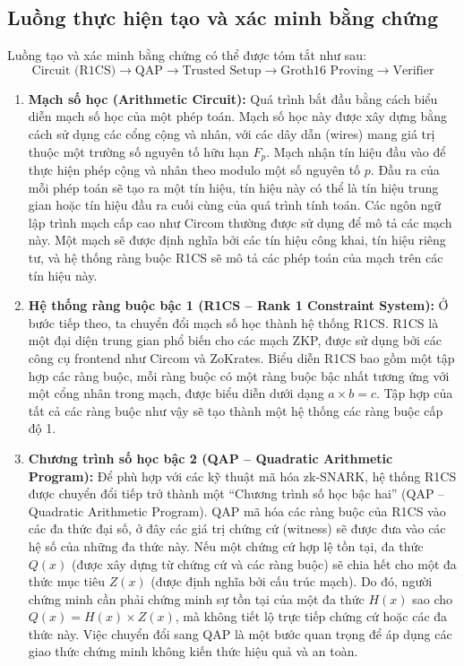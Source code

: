\subsection{Luồng thực hiện tạo và xác minh bằng chứng}
Luồng tạo và xác minh bằng chứng \cite{shi2023data} \cite{ernstberger2024zk} có thể được tóm tắt như sau:
\[
\text{Circuit (R1CS)} \rightarrow \text{QAP} \rightarrow \text{Trusted Setup} \rightarrow \text{Groth16 Proving} \rightarrow \text{Verifier}
\]
\begin{enumerate}
    \item \textbf{Mạch số học (Arithmetic Circuit):} Quá trình bắt đầu bằng cách biểu diễn mạch số học của một phép toán. Mạch số học này được xây dựng bằng cách sử dụng các cổng cộng và nhân, với các dây dẫn (wires) mang giá trị thuộc một trường số nguyên tố hữu hạn \( F_p \). Mạch nhận tín hiệu đầu vào để thực hiện phép cộng và nhân theo modulo một số nguyên tố \( p \). Đầu ra của mỗi phép toán sẽ tạo ra một tín hiệu, tín hiệu này có thể là tín hiệu trung gian hoặc tín hiệu đầu ra cuối cùng của quá trình tính toán. Các ngôn ngữ lập trình mạch cấp cao như Circom thường được sử dụng để mô tả các mạch này. Một mạch sẽ được định nghĩa bởi các tín hiệu công khai, tín hiệu riêng tư, và hệ thống ràng buộc R1CS sẽ mô tả các phép toán của mạch trên các tín hiệu này.
    \item \textbf{Hệ thống ràng buộc bậc 1 (R1CS -- Rank 1 Constraint System):} Ở bước tiếp theo, ta chuyển đổi mạch số học thành hệ thống R1CS. R1CS là một đại diện trung gian phổ biến cho các mạch ZKP, được sử dụng bởi các công cụ frontend như Circom và ZoKrates\cite{eberhardt2018zokrates}. Biểu diễn R1CS bao gồm một tập hợp các ràng buộc, mỗi ràng buộc có một ràng buộc bậc nhất tương ứng với một cổng nhân trong mạch, được biểu diễn dưới dạng \( a \times b = c \). Tập hợp của tất cả các ràng buộc như vậy sẽ tạo thành một hệ thống các ràng buộc cấp độ 1.
    \item \textbf{Chương trình số học bậc 2 (QAP -- Quadratic Arithmetic Program):} Để phù hợp với các kỹ thuật mã hóa zk-SNARK, hệ thống R1CS được chuyển đổi tiếp trở thành một ``Chương trình số học bậc hai'' (QAP -- Quadratic Arithmetic Program). QAP mã hóa các ràng buộc của R1CS vào các đa thức đại số, ở đây các giá trị chứng cứ (witness) sẽ được đưa vào các hệ số của những đa thức này. Nếu một chứng cứ hợp lệ tồn tại, đa thức \( Q(x) \) (được xây dựng từ chứng cứ và các ràng buộc) sẽ chia hết cho một đa thức mục tiêu \( Z(x) \) (được định nghĩa bởi cấu trúc mạch). Do đó, người chứng minh cần phải chứng minh sự tồn tại của một đa thức \( H(x) \) sao cho \( Q(x) = H(x) \times Z(x) \), mà không tiết lộ trực tiếp chứng cứ hoặc các đa thức này. Việc chuyển đổi sang QAP là một bước quan trọng để áp dụng các giao thức chứng minh không kiến thức hiệu quả và an toàn.

\end{enumerate}
